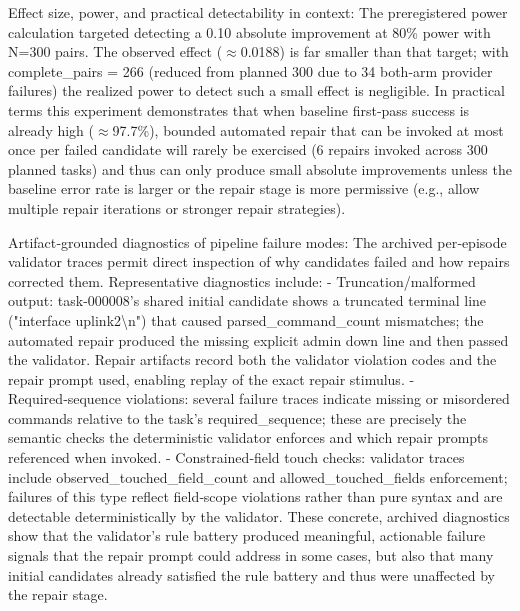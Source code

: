 \documentclass[conference]{IEEEtran}
\begin{document}
Effect size, power, and practical detectability in context: The preregistered power calculation targeted detecting a 0.10 absolute improvement at 80\% power with N=300 pairs. The observed effect (\ensuremath{\approx}0.0188) is far smaller than that target; with complete\_pairs = 266 (reduced from planned 300 due to 34 both‑arm provider failures) the realized power to detect such a small effect is negligible. In practical terms this experiment demonstrates that when baseline first‑pass success is already high (\ensuremath{\approx}97.7\%), bounded automated repair that can be invoked at most once per failed candidate will rarely be exercised (6 repairs invoked across 300 planned tasks) and thus can only produce small absolute improvements unless the baseline error rate is larger or the repair stage is more permissive (e.g., allow multiple repair iterations or stronger repair strategies).

Artifact‑grounded diagnostics of pipeline failure modes: The archived per‑episode validator traces permit direct inspection of why candidates failed and how repairs corrected them. Representative diagnostics include:
- Truncation/malformed output: task-000008's shared initial candidate shows a truncated terminal line ("interface uplink2\textbackslash{}n") that caused parsed\_command\_count mismatches; the automated repair produced the missing explicit admin down line and then passed the validator. Repair artifacts record both the validator violation codes and the repair prompt used, enabling replay of the exact repair stimulus.
- Required‑sequence violations: several failure traces indicate missing or misordered commands relative to the task's required\_sequence; these are precisely the semantic checks the deterministic validator enforces and which repair prompts referenced when invoked.
- Constrained‑field touch checks: validator traces include observed\_touched\_field\_count and allowed\_touched\_fields enforcement; failures of this type reflect field‑scope violations rather than pure syntax and are detectable deterministically by the validator.
These concrete, archived diagnostics show that the validator's rule battery produced meaningful, actionable failure signals that the repair prompt could address in some cases, but also that many initial candidates already satisfied the rule battery and thus were unaffected by the repair stage.
\end{document}

